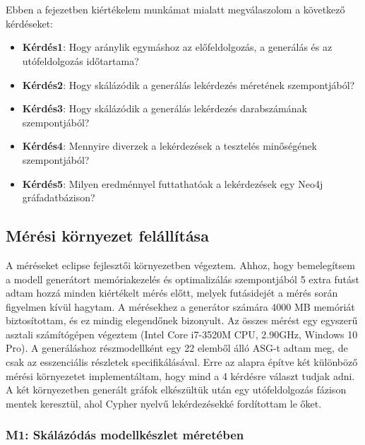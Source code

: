 \chapter{\evaluation}
\label{chp:5}

Ebben a fejezetben kiértékelem munkámat mialatt megválaszolom a következő kérdéseket:

\begin{itemize}
	\item \textbf{Kérdés1}: Hogy aránylik egymáshoz az előfeldolgozás, a generálás és az utófeldolgozás időtartama?
	\item \textbf{Kérdés2}: Hogy skálázódik a generálás lekérdezés méretének szempontjából?
	\item \textbf{Kérdés3}: Hogy skálázódik a generálás lekérdezés darabszámának szempontjából?
	\item \textbf{Kérdés4}: Mennyire diverzek a lekérdezések a tesztelés minőségének szempontjából?
	\item \textbf{Kérdés5}: Milyen eredménnyel futtathatóak a lekérdezések egy Neo4j gráfadatbázison?
\end{itemize}

\section{Mérési környezet felállítása}


A méréseket eclipse fejlesztői környezetben végeztem. Ahhoz, hogy bemelegítsem a modell generátort memóriakezelés és optimalizálás szempontjából 5 extra futást adtam hozzá minden kiértékelt mérés előtt, melyek futásidejét a mérés során figyelmen kívül hagytam. A mérésekhez a generátor számára 4000 MB memóriát biztosítottam, és ez mindig elegendőnek bizonyult. Az összes mérést egy egyszerű asztali számítógépen végeztem (Intel Core i7-3520M CPU, 2.90GHz, Windows 10 Pro). A generáláshoz részmodellként egy 22 elemből álló ASG-t adtam meg, de csak az esszenciális részletek specifikálásával. Erre az alapra építve két különböző mérési környezetet implementáltam, hogy mind a 4 kérdésre választ tudjak adni. A két környezetben generált gráfok elkészültük után egy utófeldolgozás fázison mentek keresztül, ahol Cypher nyelvű lekérdezésekké fordítottam le őket.

\subsection{M1: Skálázódás modellkészlet méretében}

